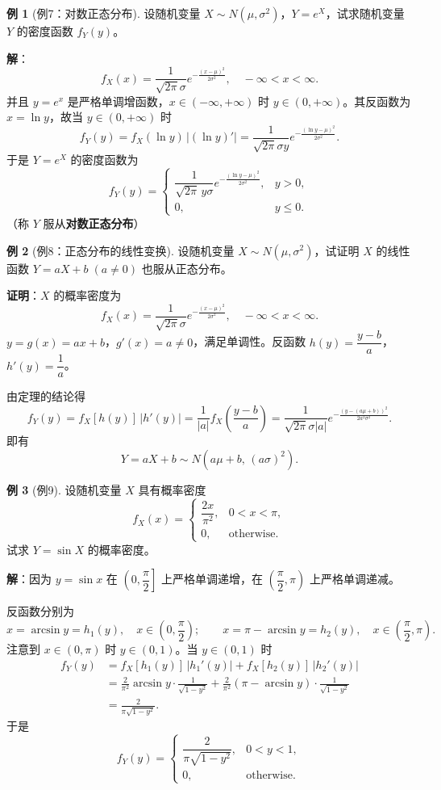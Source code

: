 \documentclass[11pt,a4paper]{report}
\theoremstyle{definition}
\newtheorem{example}{例}[chapter]
\begin{document}
\begin{example}[例7：对数正态分布]
设随机变量 $X \sim N(\mu,\sigma^2)$，$Y=e^X$，试求随机变量 $Y$ 的密度函数 $f_Y(y)$。
\end{example}

\textbf{解}：
\[
f_X(x) = \frac{1}{\sqrt{2\pi}\sigma}e^{-\frac{(x-\mu)^2}{2\sigma^2}}, \quad -\infty < x < \infty.
\]
并且 $y=e^x$ 是严格单调增函数，$x \in (-\infty,+\infty)$ 时 $y \in (0,+\infty)$。其反函数为 $x=\ln y$，故当 $y \in (0,+\infty)$ 时
\[
f_Y(y) = f_X(\ln y)\,|(\ln y)'| = \frac{1}{\sqrt{2\pi}\sigma y}e^{-\frac{(\ln y-\mu)^2}{2\sigma^2}}.
\]
于是 $Y=e^X$ 的密度函数为
\[
f_Y(y) = \begin{cases} \dfrac{1}{\sqrt{2\pi}\,y\sigma}e^{-\frac{(\ln y-\mu)^2}{2\sigma^2}}, & y > 0, \\ 0, & y \leq 0. \end{cases}
\]
（称 $Y$ 服从\textbf{对数正态分布}）

\begin{example}[例8：正态分布的线性变换]
设随机变量 $X \sim N(\mu,\sigma^2)$，试证明 $X$ 的线性函数 $Y=aX+b\;(a \neq 0)$ 也服从正态分布。
\end{example}

\textbf{证明}：$X$ 的概率密度为
\[
f_X(x) = \frac{1}{\sqrt{2\pi}\sigma}e^{-\frac{(x-\mu)^2}{2\sigma^2}}, \quad -\infty < x < \infty.
\]
$y=g(x)=ax+b$，$g'(x)=a \neq 0$，满足单调性。反函数 $h(y)=\dfrac{y-b}{a}$，$h'(y)=\dfrac{1}{a}$。

由定理的结论得
\[
f_Y(y) = f_X[h(y)]\,|h'(y)| = \frac{1}{|a|}f_X\left(\frac{y-b}{a}\right) = \frac{1}{\sqrt{2\pi}\sigma|a|}e^{-\frac{(y-(a\mu+b))^2}{2a^2\sigma^2}}.
\]
即有
\[
\boxed{Y = aX+b \sim N(a\mu+b,\, (a\sigma)^2)}.
\]

\begin{example}[例9]
设随机变量 $X$ 具有概率密度
\[
f_X(x) = \begin{cases} \dfrac{2x}{\pi^2}, & 0 < x < \pi, \\ 0, & \text{otherwise}. \end{cases}
\]
试求 $Y=\sin X$ 的概率密度。
\end{example}

\textbf{解}：因为 $y=\sin x$ 在 $\left(0,\dfrac{\pi}{2}\right]$ 上严格单调递增，在 $\left(\dfrac{\pi}{2},\pi\right)$ 上严格单调递减。

反函数分别为
\[
x = \arcsin y = h_1(y), \quad x \in \left(0,\frac{\pi}{2}\right); \qquad x = \pi-\arcsin y = h_2(y), \quad x \in \left(\frac{\pi}{2},\pi\right).
\]
注意到 $x \in (0,\pi)$ 时 $y \in (0,1)$。当 $y \in (0,1)$ 时
\begin{align*}
f_Y(y) &= f_X[h_1(y)]\,|h_1'(y)| + f_X[h_2(y)]\,|h_2'(y)| \\
&= \frac{2}{\pi^2}\arcsin y \cdot \frac{1}{\sqrt{1-y^2}} + \frac{2}{\pi^2}(\pi-\arcsin y) \cdot \frac{1}{\sqrt{1-y^2}} \\
&= \frac{2}{\pi\sqrt{1-y^2}}.
\end{align*}
于是
\[
f_Y(y) = \begin{cases} \dfrac{2}{\pi\sqrt{1-y^2}}, & 0 < y < 1, \\ 0, & \text{otherwise}. \end{cases}
\]
\end{document}
